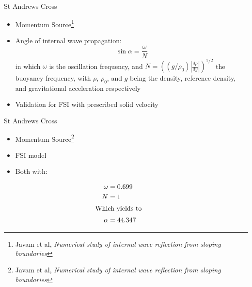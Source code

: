 \documentclass[	%
	bigger, %
	hyperref, %
	xcolor,	%
	t,		%
]{beamer}
\begin{document}
\begin{frame}{St Andrews Cross}
 \begin{itemize}
  \item Momentum Source\footnote[3]{Javam et al, \textsl{Numerical study of internal wave reflection from sloping boundaries}}
  \item Angle of internal wave propagation:
   \begin{equation}
    \sin\alpha = \frac{\omega}{N}
   \end{equation}
   in which $\omega$ is the oscillation frequency, and $N=\left(\left(g/\rho_0\right)\left|\tfrac{d\rho}{dy}\right|\right)^{1/2}$ the buoyancy frequency, with $\rho$, $\rho_0$, and $g$ being the density, reference density, and gravitational acceleration respectively
  \item Validation for FSI with prescribed solid velocity
 \end{itemize}
\end{frame}

\begin{frame}{St Andrews Cross}
 \begin{itemize}
  \item Momentum Source\footnote[3]{Javam et al, \textsl{Numerical study of internal wave reflection from sloping boundaries}}
  \item FSI model
  \item Both with:
 \end{itemize}
 \begin{align*}
  & & \omega &= 0.699 & & & & & &\\
  & & N &= 1 & & & & & &\\
  \shortintertext{Which yields to}
  & & \alpha &= 44.347 & & & & & &
 \end{align*}
\end{frame}
\end{document}
